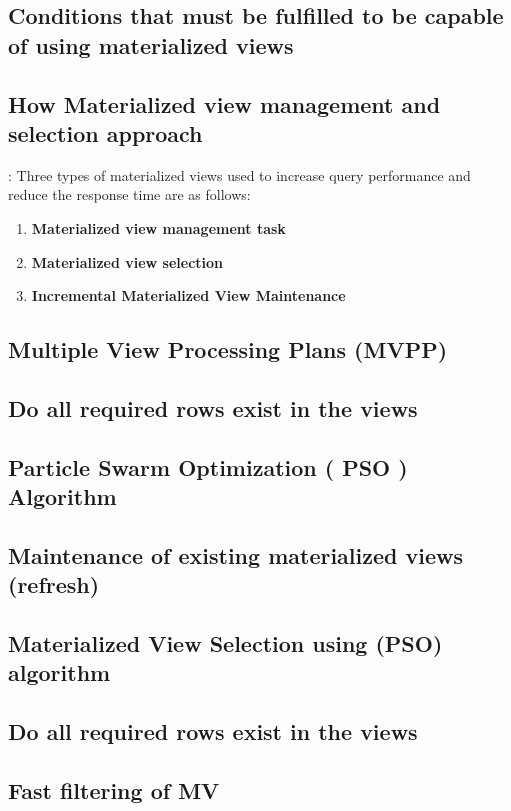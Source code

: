 \subsection{Conditions that must be fulfilled to be capable of using materialized views }

\subsection{ How Materialized view management and selection approach}: Three types of materialized views used to increase query performance and reduce the response time are as follows:

\begin{enumerate}[label=\alph*)]
    \item \textbf{Materialized view management task}
    \item \textbf{Materialized view selection}
    \item \textbf{Incremental Materialized View Maintenance}
\end{enumerate}

\subsection{Multiple View Processing Plans (MVPP) }
\subsection{Do all required rows exist in the views }
\subsection{Particle Swarm Optimization ( PSO ) Algorithm
 }
\subsection{Maintenance of existing materialized views (refresh)
}
\subsection{Materialized View Selection using (PSO) algorithm }
\subsection{Do all required rows exist in the views }
\subsection{Fast filtering of MV}

